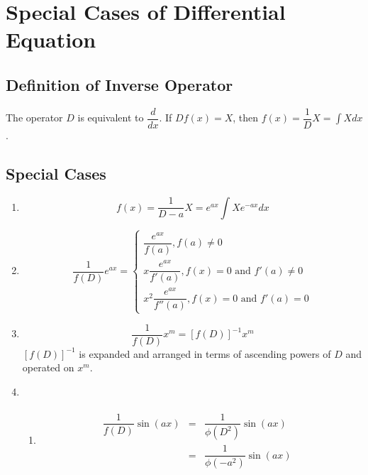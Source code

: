 \section{Special Cases of Differential Equation}
\subsection{Definition of Inverse Operator}
The operator $D$ is equivalent to $\dfrac{d}{dx}$. If $Df(x)=X$, then $f(x)=\dfrac{1}{D}X=\int X dx$.

\subsection{Special Cases}
\begin{enumerate}
	\item \begin{equation}f(x)=\dfrac{1}{D-a}X=e^{ax}\int Xe^{-ax}dx \end{equation}

	\item \begin{equation}\dfrac{1}{f(D)}e^{ax}=\begin{cases}
			\dfrac{e^{ax}}{f(a)}, f(a)\neq 0\\
			x\dfrac{e^{ax}}{f'(a)}, f(x)=0 \text{ and } f'(a)\neq 0\\
			x^2\dfrac{e^{ax}}{f''(a)}, f(x)=0 \text{ and } f'(a)= 0
		\end{cases}
	\end{equation}

	\item \begin{equation} \dfrac{1}{f(D)}x^m=[f(D)]^{-1} x^m \end{equation}
	$[f(D)]^{-1}$ is expanded and arranged in terms of ascending powers of $D$ and operated on $x^m$.

	\item \begin{enumerate}
		\item \begin{equation}\begin{aligned}\begin{split} \dfrac{1}{f(D)} \sin (ax) &=& \dfrac{1}{\phi(D^2)} \sin (ax)&\\ &=&\dfrac{1}{\phi(-a^2)} \sin (ax) \end{split}\end{aligned}\end{equation}


\end{enumerate}
\end{enumerate}
